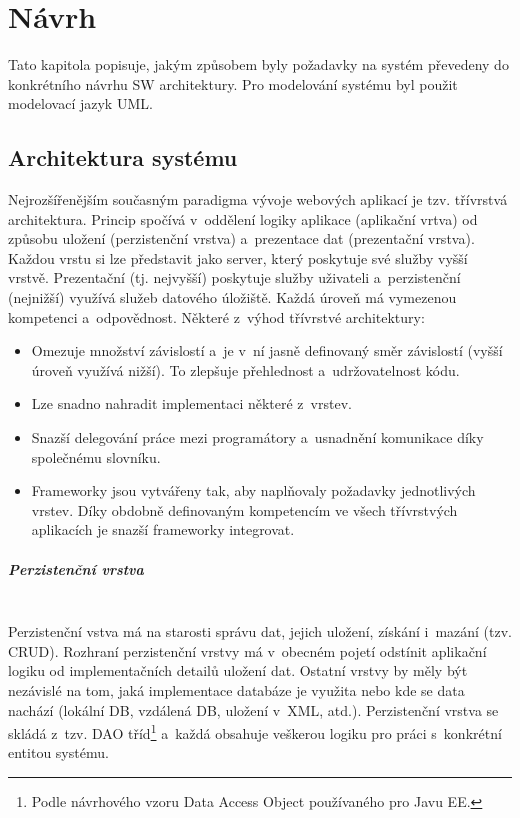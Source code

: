 \documentclass[11pt, final, oneside]{fithesis2}
\newcommand{\paragraphNewLine}[1]{\paragraph*{#1}\mbox{}\\}
\begin{document}
\chapter{Návrh}\label{chapter:proposal}
Tato kapitola popisuje, jakým způsobem byly požadavky na systém převedeny do konkrétního návrhu SW architektury. Pro modelování systému byl použit modelovací jazyk UML.


\section{Architektura systému}
Nejrozšířenějším současným paradigma vývoje webových aplikací je tzv. třívrstvá architektura. Princip spočívá v~oddělení logiky aplikace (aplikační vrtva) od způsobu uložení (perzistenční vrstva) a~prezentace dat (prezentační vrstva). Každou vrstu si lze představit jako server, který poskytuje své služby vyšší vrstvě. Prezentační (tj. nejvyšší) poskytuje služby uživateli a~perzistenční (nejnižší) využívá služeb datového úložiště. Každá úroveň má vymezenou kompetenci a~odpovědnost.
Některé z~výhod třívrstvé architektury:
\begin{itemize}
	\item Omezuje množství závislostí a~je v~ní jasně definovaný směr závislostí (vyšší úroveň využívá nižší). To zlepšuje přehlednost a~udržovatelnost kódu.
	\item Lze snadno nahradit implementaci některé z~vrstev.
	\item Snazší delegování práce mezi programátory a~usnadnění komunikace díky společnému slovníku.
	\item Frameworky jsou vytvářeny tak, aby naplňovaly požadavky jednotlivých vrstev. Díky obdobně definovaným kompetencím ve všech třívrstvých aplikacích je snazší frameworky integrovat.
\end{itemize}

\paragraphNewLine{Perzistenční vrstva}
Perzistenční vstva má na starosti správu dat, jejich uložení, získání i~mazání (tzv. CRUD). Rozhraní perzistenční vrstvy má v~obecném pojetí odstínit aplikační logiku od implementačních detailů uložení dat. Ostatní vrstvy by měly být nezávislé na tom, jaká implementace databáze je využita nebo kde se data nachází (lokální DB, vzdálená DB, uložení v~XML, atd.).
Perzistenční vrstva se skládá z~tzv. DAO tříd\footnote{Podle návrhového vzoru Data Access Object používaného pro Javu EE.} a~každá obsahuje veškerou logiku pro práci s~konkrétní entitou systému.
\end{document}
